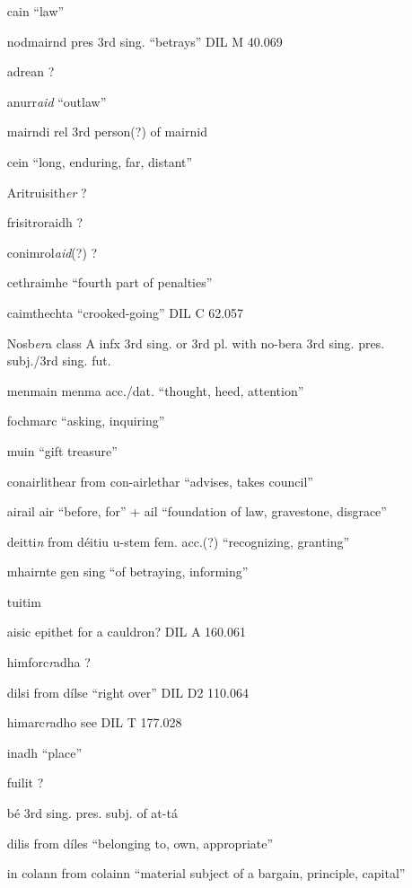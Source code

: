 \documentclass[11pt]{article}
\begin{document}
\begin{enumerate}
  \item[cain] \enquote{law}
  \item[nodmairnd] pres 3rd sing. \enquote{betrays} DIL M 40.069
  \item[adrean] ?
  \item[anurr\emph{aid}] \enquote{outlaw}
  \item[mairndi] rel 3rd person(?) of mairnid
  \item[cein] \enquote{long, enduring, far, distant} 
  \item[Aritruisith\emph{er}] ?
  \item[frisitroraidh] ? 
  \item[conimrol\emph{aid}(?)] ?
  \item[cethraimhe] \enquote{fourth part of penalties}
  \item[caimthechta] \enquote{crooked-going} DIL C 62.057
  \item[Nosb\emph{er}a] class A infx 3rd sing. or 3rd pl. with no-bera 3rd sing. pres. subj./3rd sing. fut.
  \item[menmain] menma acc./dat. \enquote{thought, heed, attention}
  \item[fochmarc] \enquote{asking, inquiring}
  \item[muin] \enquote{gift treasure}
  \item[conairlithear] from con-airlethar \enquote{advises, takes council}
  \item[airail] air \enquote{before, for} + ail \enquote{foundation of law, gravestone, disgrace}
  \item[deitti\emph{n}] from d\'{e}itiu u-stem fem. acc.(?) \enquote{recognizing, granting}
  \item[mhairnte] gen sing \enquote{of betraying, informing}
  \item[tuitim]
  \item[aisic] epithet for a cauldron? DIL A 160.061
  \item[himforc\emph{r}adha] ?
  \item[dilsi] from d\'{i}lse \enquote{right over} DIL D2 110.064
  \item[himarc\emph{r}adho] see DIL T 177.028
  \item[inadh] \enquote{place}
  \item[fuilit] ?
  \item[b\'{e}] 3rd sing. pres. subj. of at-t\'{a}
  \item[dilis] from d\'{i}les \enquote{belonging to, own, appropriate}
  \item[in colann] from colainn \enquote{material subject of a bargain, principle, capital}

\end{enumerate}
\end{document}
